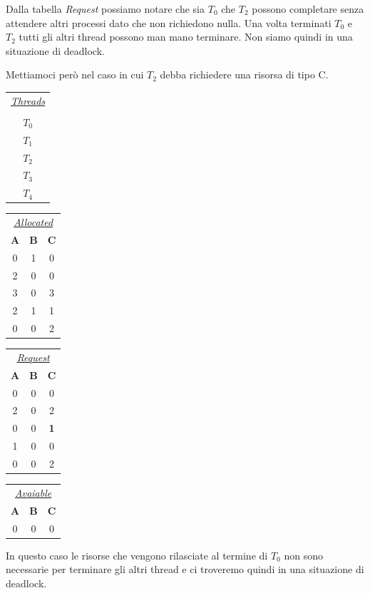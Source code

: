 \noindent Dalla tabella \textit{Request} possiamo notare che sia $T_0$ che $T_2$ possono completare senza attendere altri processi dato che non richiedono nulla. Una volta terminati $T_0$ e $T_2$ tutti gli altri thread possono man mano terminare. Non siamo quindi in una situazione di deadlock.

Mettiamoci però nel caso in cui $T_2$ debba richiedere una risorsa di tipo C.
\begin{table}[h]
    \centering
    \begin{tabular}{c}
         \underline{\textit{Threads}} \\\\ $T_0$ \\ $T_1$ \\ $T_2$ \\ $T_3$ \\ $T_4$
    \end{tabular}
    \begin{tabular}{c c c}
         \multicolumn{3}{c}{\underline{\textit{Allocated}}} \\
         \textbf{A} & \textbf{B} & \textbf{C} \\
         0 & 1 & 0 \\
         2 & 0 & 0 \\
         3 & 0 & 3 \\
         2 & 1 & 1 \\
         0 & 0 & 2 \\
    \end{tabular}
    \hspace{5px}
    \begin{tabular}{c c c}
         \multicolumn{3}{c}{\underline{\textit{Request}}} \\
         \textbf{A} & \textbf{B} & \textbf{C} \\
         0 & 0 & 0 \\
         2 & 0 & 2 \\
         0 & 0 & \textbf{1} \\
         1 & 0 & 0 \\
         0 & 0 & 2 \\
    \end{tabular} 
    \hspace{5pt}
    \begin{tabular}{c c c}
         \multicolumn{3}{c}{\underline{\textit{Avaiable}}} \\
         \textbf{A} & \textbf{B} & \textbf{C} \\
         0 & 0 & 0 
    \end{tabular}
\end{table}
In questo caso le risorse che vengono rilasciate al termine di $T_0$ non sono necessarie per terminare gli altri thread e ci troveremo quindi in una situazione di deadlock.
% 

